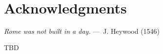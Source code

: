 
\chapter{Acknowledgments}

\begin{epigraph}
    \emph{Rome was not built in a day.} ---~J. Heywood  (1546)
\end{epigraph}

TBD
